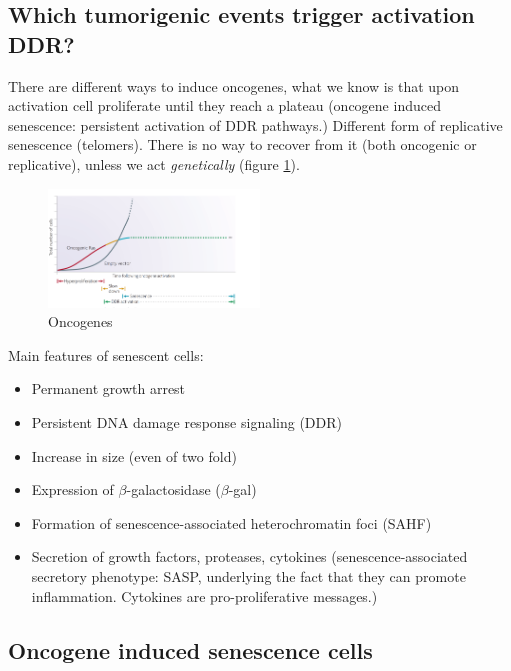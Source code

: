 \hypertarget{which-tumorigenic-events-trigger-activation-ddr-very-early-in-tumorigenesis}{%
\subsection{Which tumorigenic events trigger activation DDR?}\label{which-tumorigenic-events-trigger-activation-ddr-very-early-in-tumorigenesis}}

There are different ways to induce oncogenes, what we know is that upon activation cell proliferate until they reach a plateau (oncogene
induced senescence: persistent activation of DDR pathways.) 
Different form of replicative senescence (telomers). There is no way to recover from it (both oncogenic or replicative), unless we act \emph{genetically} (figure \ref{fig:activation}).

\begin{figure}[h!]
\centering
\includegraphics[width=0.5\textwidth]{../_resources/e5bec01cb6c2d9a42b67721810b931fb.png}
\caption{Oncogenes}
\label{fig:activation}
\end{figure}

Main features of senescent cells: 
\begin{itemize}
\tightlist
\item Permanent growth arrest 
\item Persistent DNA damage response signaling (DDR) 
\item Increase in size (even of two
fold)
\item Expression of $\beta$-galactosidase ($\beta$-gal) 
\item Formation of
senescence-associated heterochromatin foci (SAHF) 
\item Secretion of growth factors, proteases, cytokines (senescence-associated secretory phenotype: SASP, underlying the fact that they can promote inflammation. Cytokines are pro-proliferative messages.)
\end{itemize}

\hypertarget{oncogene-induced-senescence-cells}{%
\subsection{Oncogene induced senescence
cells}\label{oncogene-induced-senescence-cells}}


